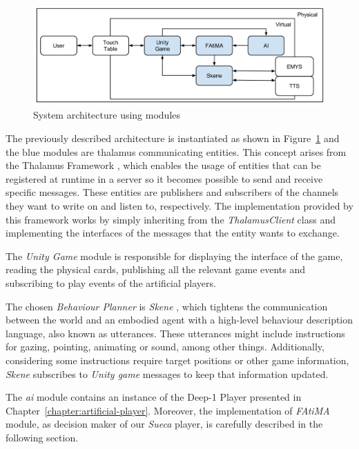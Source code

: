 \begin{figure}[ht]
  \centering
    \includegraphics[width=1\textwidth]{./img/6/model}
  \caption{System architecture using modules}
\label{fig:model}
\end{figure}

The previously described architecture is instantiated as shown in Figure~\ref{fig:model} and the blue modules are thalamus communicating entities.
This concept arises from the Thalamus Framework \cite{Ribeiro}, which enables the usage of entities that can be registered at runtime in a server so it becomes possible to send and receive specific messages.
These entities are publishers and subscribers of the channels they want to write on and listen to, respectively.
The implementation provided by this framework works by simply inheriting from the \emph{ThalamusClient} class and implementing the interfaces of the messages that the entity wants to exchange.

The \emph{Unity Game} module is responsible for displaying the interface of the game, reading the physical cards, publishing all the relevant game events and subscribing to play events of the artificial players.

The chosen \emph{Behaviour Planner} is \emph{Skene} \cite{Ribeiroa}, which tightens the communication between the world and an embodied agent with a high-level behaviour description language, also known as utterances.
These utterances might include instructions for gazing, pointing, animating or sound, among other things.
Additionally, considering some instructions require target positions or other game information, \emph{Skene} subscribes to \emph{Unity game} messages to keep that information updated.

The \emph{\ac{ai}} module contains an instance of the Deep-1 Player presented in Chapter~\ref{chapter:artificial-player}.
Moreover, the implementation of \emph{FAtiMA} module, as decision maker of our \emph{Sueca} player, is carefully described in the following section.
